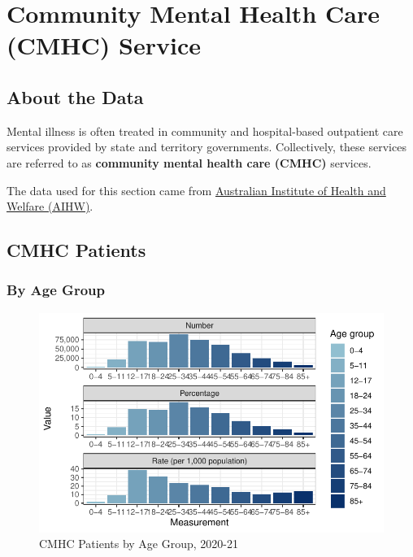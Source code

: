 \documentclass[
  a4paper,
  DIV=11,
  numbers=noendperiod]{scrreport}
\begin{document}

\hypertarget{community-mental-health-care-cmhc-service}{%
\chapter{Community Mental Health Care (CMHC)
Service}\label{community-mental-health-care-cmhc-service}}

\hypertarget{about-the-data-1}{%
\section{About the Data}\label{about-the-data-1}}

Mental illness is often treated in community and hospital-based
outpatient care services provided by state and territory governments.
Collectively, these services are referred to as \textbf{community mental
health care (CMHC)} services.

The data used for this section came from
\href{https://www.aihw.gov.au/mental-health/topic-areas/community-services\#data}{Australian
Institute of Health and Welfare (AIHW)}.

\hypertarget{cmhc-patients}{%
\section{CMHC Patients}\label{cmhc-patients}}

\hypertarget{by-age-group-2}{%
\subsection{By Age Group}\label{by-age-group-2}}

\begin{figure}

\caption{\label{fig-cmhc-a}CMHC Patients by Age Group, 2020-21}

{\centering \includegraphics{./chap2-cmhc_files/figure-pdf/fig-cmhc-a-1.pdf}

}

\end{figure}
\end{document}
